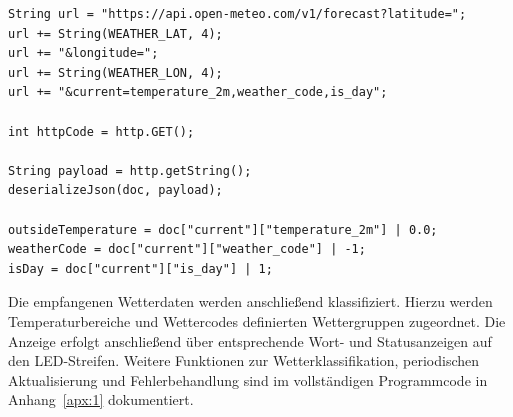 \begin{lstlisting}[style=arduino,caption={Auszug aus der Wetterdatenabfrage}]
String url = "https://api.open-meteo.com/v1/forecast?latitude=";
url += String(WEATHER_LAT, 4);
url += "&longitude=";
url += String(WEATHER_LON, 4);
url += "&current=temperature_2m,weather_code,is_day";

int httpCode = http.GET();

String payload = http.getString();
deserializeJson(doc, payload);

outsideTemperature = doc["current"]["temperature_2m"] | 0.0;
weatherCode = doc["current"]["weather_code"] | -1;
isDay = doc["current"]["is_day"] | 1;
\end{lstlisting}

Die empfangenen Wetterdaten werden anschließend klassifiziert.  
Hierzu werden Temperaturbereiche und Wettercodes definierten Wettergruppen zugeordnet.  
Die Anzeige erfolgt anschließend über entsprechende Wort- und Statusanzeigen auf den LED-Streifen.
Weitere Funktionen zur Wetterklassifikation, periodischen Aktualisierung und Fehlerbehandlung sind im vollständigen Programmcode in Anhang~\ref{apx:1} dokumentiert.